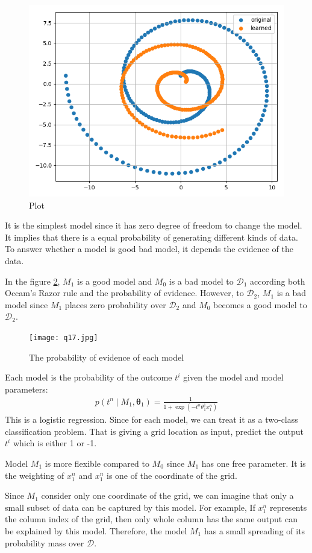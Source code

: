 \documentclass[12pt]{article}
\newenvironment{question}[2][Question]{\begin{trivlist}
\kern10pt
\item[\hskip \labelsep {\bfseries #1}\hskip \labelsep {\bfseries #2.}]}{\end{trivlist}}
\begin{document}
\begin{question}{16}
  \begin{figure}[h!] %
    \centering
    \includegraphics[width=0.5\linewidth]{fig/Q16-replearn.png}
    \caption{Plot }
    \label{fig:q16-replearn}
  \end{figure}
\end{question}

\begin{question}{17}
It is the simplest model since it has zero degree of freedom to change the model.
It implies that there is a equal probability of generating different kinds of
data. To answer whether a model is good bad model, it depends the evidence
of the data. 

In the figure \ref{fig:q17-model-evidence}, $M_1$ is a good model and $M_0$ is a 
bad model to $\mathcal{D}_1$ according both Occam’s Razor rule and the probability
of evidence. However, to $\mathcal{D}_2$, $M_1$ is a bad model since $M_1$ places
zero probability over $\mathcal{D}_2$ and $M_0$ becomes a good model to $\mathcal{D}_2$.
\begin{figure}[h!] %
  \centering
  \texttt{[image: q17.jpg]}
  \caption{The probability of evidence of each model}
  \label{fig:q17-model-evidence}
\end{figure}
\end{question}

\begin{question}{18}
Each model is the probability of the outcome $t^i$ given the model and model
parameters:
\begin{align*}
  p(t^n\mid M_1, \bm{\theta}_1) = \frac{1}{1 + \exp(-t^n\theta^1_1 x^n_1)}
\end{align*}
This is a logistic regression. Since for each model, we can treat it as a 
two-class classification problem. That is giving a grid location as input, 
predict the output $t^i$ which is either 1 or -1.

Model $M_1$ is more flexible compared to $M_0$ since $M_1$ has one 
free parameter. It is the weighting of $x^n_1$ and $x^n_1$ is one of the coordinate
of the grid.

Since $M_1$ consider only one coordinate of the grid, we can imagine that only a 
small subset of data can be captured by this model. 
For example, If $x^n_1$ represents the column index of the grid, then only whole
column has the same output can be explained by this model.
Therefore, the model $M_1$ has a small spreading of its probability mass over 
$\mathcal{D}$.
\end{question}
\end{document}
